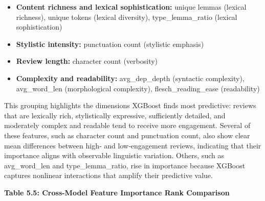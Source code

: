 \documentclass[
]{article}
\begin{document}
\begin{itemize}

\item \textbf{Content richness and lexical sophistication:}  
unique lemmas (lexical richness), unique tokens (lexical diversity), type\_lemma\_ratio (lexical sophistication)

\item \textbf{Stylistic intensity:}  
punctuation count (stylistic emphasis)

\item \textbf{Review length:}  
character count (verbosity)

\item \textbf{Complexity and readability:}  
avg\_dep\_depth (syntactic complexity), avg\_word\_len (morphological complexity), flesch\_reading\_ease (readability)

\end{itemize}

This grouping highlights the dimensions XGBoost finds most predictive:
reviews that are lexically rich, stylistically expressive, sufficiently
detailed, and moderately complex and readable tend to receive more
engagement. Several of these features, such as character count and
punctuation count, also show clear mean differences between high‑ and
low‑engagement reviews, indicating that their importance aligns with
observable linguistic variation. Others, such as avg\_word\_len and
type\_lemma\_ratio, rise in importance because XGBoost captures
nonlinear interactions that amplify their predictive value.

\textbf{Table 5.5: Cross-Model Feature Importance Rank Comparison}
\end{document}
